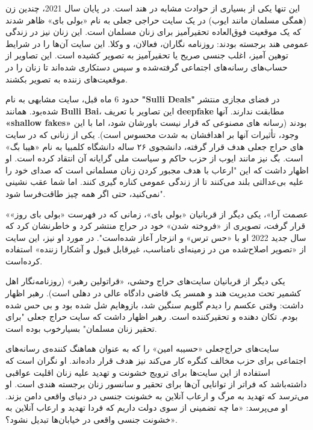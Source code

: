 این تنها یکی از بسیاری از حوادث مشابه در هند است.
در پایان سال 2021، چندین زن (همگی مسلمان مانند ایوب) در یک سایت حراجی جعلی به نام «بولی بای» ظاهر شدند که یک موقعیت فوق‌العاده تحقیرآمیز برای زنان مسلمان است.
این زنان نیز در زندگی عمومی هند برجسته بودند: روزنامه نگاران، فعالان، و وکلا.
این سایت آن‌ها را در شرایط توهین آمیز، اغلب جنسی صریح یا تحقیرآمیز به تصویر کشیده است.
این تصاویر از حساب‌های رسانه‌های اجتماعی گرفته‌شده و سپس دستکاری شده‌اند تا زنان را در موقعیت‌های زننده به تصویر بکشند.

حدود 6 ماه قبل، سایت مشابهی به نام \textenglish{\textbf{"Sulli Deals"}} در فضای مجازی منتشر شده‌بود.
همانند \textenglish{\textbf{Bulli Bai}}، این تصاویر با تعریف \textenglish{\textbf{deepfake}} مطابقت ندارند.
آنها \textenglish{\textbf{«shallow fakes»}} بودند (رسانه های مصنوعی که قرار نیست باورشان شود، اما با این وجود، تأثیرات آنها بر اهدافشان به شدت محسوس است).
یکی از زنانی که در سایت های حراج جعلی هدف قرار گرفته، دانشجوی ۲۶ ساله دانشگاه کلمبیا به نام «هیبا بگ» است.
بگ نیز مانند ایوب از حزب حاکم و سیاست ملی گرایانه آن انتقاد کرده است.
او اظهار داشت که این "ارعاب با هدف مجبور کردن زنان مسلمانی است که صدای خود را علیه بی‌عدالتی بلند می‌کنند تا از زندگی عمومی کناره گیری کنند.
اما شما عقب نشینی نمی‌کنید، حتی اگر همه چیز طاقت‌فرسا شود".

«عصمت آرا»، یکی دیگر از قربانیان «بولی بای»، زمانی که در فهرست «بولی بای روز» قرار گرفت، تصویری از «فروخته شدن» خود در حراج منتشر کرد و خاطرنشان کرد که سال جدید 2022 او با «حس ترس» و انزجار آعاز شده‌است".
در مورد او نیز، این سایت از «تصویر اصلاح‌شده من در زمینه‌ای نامناسب، غیرقابل قبول و آشکارا زننده» استفاده کرده‌است.

یکی دیگر از قربانیان سایت‌های حراج وحشی، «قراتولین رهبر» (روزنامه‌نگار اهل کشمیر تحت مدیریت هند و همسر یک قاضی دادگاه عالی در دهلی است).
رهبر اظهار داشت: وقتی عکسم را دیدم گلویم سنگین شد، بازوهایم شل شده بود و بی حس شده بودم.
تکان دهنده و تحقیرکننده است.
رهبر اظهار داشت که سایت حراج جعلی "برای تحقیر زنان مسلمان" بسیار‌خوب بوده است.

سایت‌های حراج‌جعلی «حسیبه امین» را که به عنوان هماهنگ کننده‌ی رسانه‌های اجتماعی برای حزب مخالف کنگره کار می‌کند نیز هدف قرار داده‌اند.
او نگران است که استفاده از این سایت‌ها برای ترویج خشونت و تهدید علیه زنان اقلیت عواقبی داشته‌باشد که فراتر از توانایی آن‌ها برای تحقیر و سانسور زنان برجسته هندی است.
او می‌ترسد که تهدید به مرگ و ارعاب آنلاین به خشونت جنسی در دنیای واقعی دامن بزند.
او می‌پرسد: «ما چه تضمینی از سوی دولت داریم که فردا تهدید و ارعاب آنلاین به خشونت جنسی واقعی در خیابان‌ها تبدیل نشود؟».

